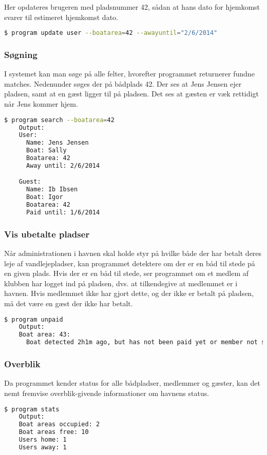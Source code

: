 Her opdateres brugeren med pladsnummer 42, sådan at hans dato for hjemkomst svarer til estimeret hjemkomst dato.

\begin{lstlisting}[language=bash, label={lst:update_travel}] 
  $ program update user --boatarea=42 --awayuntil="2/6/2014" 
\end{lstlisting}

\subsubsection{Søgning}
\label{ssub:Sogning}

I systemet kan man søge på alle felter, hvorefter programmet returnerer fundne matches. Nedenunder søges der på bådplads 42. Der ses at Jens Jensen ejer pladsen, samt at en gæst ligger til på pladsen. Det ses at gæsten er væk rettidigt når Jens kommer hjem.

\begin{lstlisting}[language=bash, label={lst:search}] 
  $ program search --boatarea=42
    Output:
    User:
      Name: Jens Jensen
      Boat: Sally
      Boatarea: 42
      Away until: 2/6/2014 

    Guest:
      Name: Ib Ibsen
      Boat: Igor
      Boatarea: 42
      Paid until: 1/6/2014
\end{lstlisting}

\subsubsection{Vis ubetalte pladser}
\label{ssub:Vis_ubetalte_pladser}

Når administrationen i havnen skal holde styr på hvilke både der har betalt deres leje af vandlejepladser, kan programmet detektere om der er en båd til stede på en given plads. Hvis der er en båd til stede, ser programmet om et medlem af klubben har logget ind på pladsen, dvs. at tilkendegive at medlemmet er i havnen. Hvis medlemmet ikke har gjort dette, og der ikke er betalt på pladsen, må det være en gæst der ikke har betalt.

\begin{lstlisting}[language=bash, label={lst:show_unpaid}] 
  $ program unpaid
    Output:
    Boat area: 43:
      Boat detected 2h1m ago, but has not been paid yet or member not signed in. 
\end{lstlisting}

\subsubsection{Overblik}
\label{ssub:overblik}

Da programmet kender status for alle bådpladser, medlemmer og gæster, kan det nemt fremvise overblik-givende informationer om havnens status.

\begin{lstlisting}[language=bash, label={lst:overview}] 
  $ program stats 
    Output:
    Boat areas occupied: 2
    Boat areas free: 10
    Users home: 1
    Users away: 1
\end{lstlisting}
